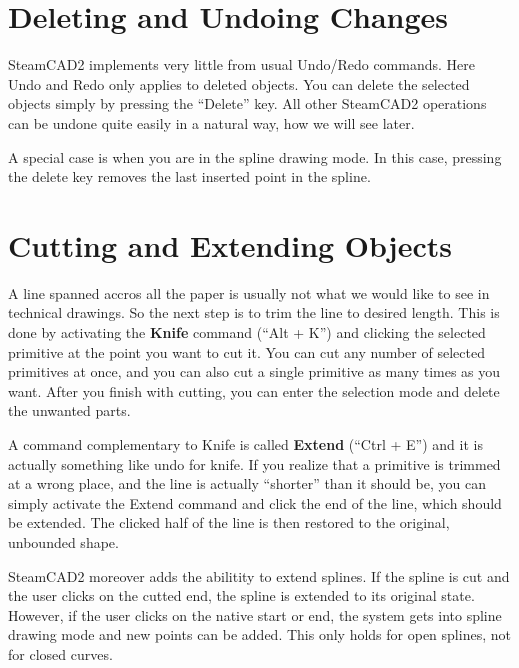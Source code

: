 \section{Deleting and Undoing Changes}

SteamCAD2 implements very little from usual Undo/Redo
commands. Here Undo and Redo only applies to deleted objects. You can delete the selected
objects simply by pressing the ``Delete'' key. All other SteamCAD2 operations can be
undone quite easily in a natural way, how we will see later.

A special case is when you are in the spline drawing mode. In this case, pressing the delete
key removes the last inserted point in the spline.

\section{Cutting and Extending Objects}\label{sec:extend}

A line spanned accros all the paper is usually not what we would like to see in technical
drawings. So the next step is to trim the line to desired length. This is done by
activating the \textbf{Knife} command (``Alt + K'') and clicking the selected primitive at the
point you want to cut it. You can cut any number of selected primitives at once,
and you can also cut a single primitive as many times as you want. After you finish
with cutting, you can enter the selection mode and delete the unwanted parts.

A command complementary to Knife is called \textbf{Extend} (``Ctrl + E'') and it is
actually something like undo for knife. If you realize that a primitive is trimmed
at a wrong place, and the line is actually ``shorter'' than it should be, you can simply
activate the Extend command and click the end of the line, which should be extended.
The clicked half of the line is then restored to the original, unbounded shape.

SteamCAD2 moreover adds the abilitity to extend splines. If the spline is cut and the
user clicks on the cutted end, the spline is extended to its original state. However,
if the user clicks on the native start or end, the system gets into spline drawing mode
and new points can be added. This only holds for open splines, not for closed curves.

